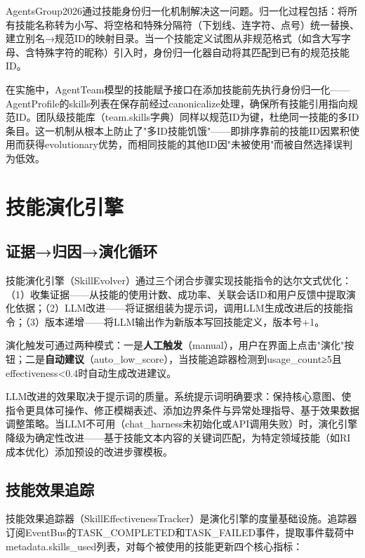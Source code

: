 \documentclass[conference]{IEEEtran}
\begin{document}
AgentsGroup2026通过技能身份归一化机制解决这一问题。归一化过程包括：将所有技能名称转为小写、将空格和特殊分隔符（下划线、连字符、点号）统一替换、建立别名→规范ID的映射目录。当一个技能定义试图从非规范格式（如含大写字母、含特殊字符的昵称）引入时，身份归一化器自动将其匹配到已有的规范技能ID。

在实施中，AgentTeam模型的技能赋予接口在添加技能前先执行身份归一化——AgentProfile的skills列表在保存前经过canonicalize处理，确保所有技能引用指向规范ID。团队级技能库（team.skills字典）同样以规范ID为键，杜绝同一技能的多ID条目。这一机制从根本上防止了"多ID技能饥饿"——即排序靠前的技能ID因累积使用而获得evolutionary优势，而相同技能的其他ID因"未被使用"而被自然选择误判为低效。

\section{技能演化引擎}

\subsection{证据→归因→演化循环}

技能演化引擎（SkillEvolver）通过三个闭合步骤实现技能指令的达尔文式优化：（1）收集证据——从技能的使用计数、成功率、关联会话ID和用户反馈中提取演化依据；（2）LLM改进——将证据组装为提示词，调用LLM生成改进后的技能指令；（3）版本递增——将LLM输出作为新版本写回技能定义，版本号+1。

演化触发可通过两种模式：一是\textbf{人工触发}（manual），用户在界面上点击"演化"按钮；二是\textbf{自动建议}（auto\_low\_score），当技能追踪器检测到usage\_count≥5且effectiveness<0.4时自动生成改进建议。

LLM改进的效果取决于提示词的质量。系统提示词明确要求：保持核心意图、使指令更具体可操作、修正模糊表述、添加边界条件与异常处理指导、基于效果数据调整策略。当LLM不可用（chat\_harness未初始化或API调用失败）时，演化引擎降级为确定性改进——基于技能文本内容的关键词匹配，为特定领域技能（如RI成本优化）添加预设的改进步骤模板。

\subsection{技能效果追踪}

技能效果追踪器（SkillEffectivenessTracker）是演化引擎的度量基础设施。追踪器订阅EventBus的TASK\_COMPLETED和TASK\_FAILED事件，提取事件载荷中metadata.skills\_used列表，对每个被使用的技能更新四个核心指标：
\end{document}
